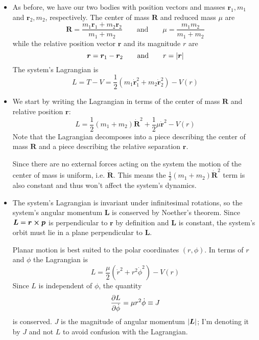 \documentclass[11pt, a4paper]{article}
\newcommand{\eqtext}[1]{\qquad \text{#1} \qquad}
\newcommand{\bdot}[1]{\dot{\bm{#1}}}
\begin{document}
\begin{itemize}
	\item As before, we have our two bodies with position vectors and masses $ \bm{r}_{1}, m_{1} $  and $ \bm{r}_{2}, m_{2}$, respectively. The center of mass $ \bm{R} $ and reduced mass $ \mu $ are
	\begin{equation*}
		 \bm{R} = \frac{m_{1}\bm{r}_{1} + m_{2}\bm{r}_{2}}{m_{1} + m_{2}} \eqtext{and} \mu = \frac{m_{1}m_{2}}{m_{1} + m_{2}}
	\end{equation*}
	while the relative position vector $ \bm{r} $ and its magnitude $ r $ are
	\begin{equation*}
		\bm{r} = \bm{r}_{1} - \bm{r}_{2}  \eqtext{and} r = \abs{\bm{r}}
	\end{equation*}
	The system's Lagrangian is
	\begin{equation*}
		L = T - V = \frac{1}{2}\left(m_{1}\bdot{r}_{1}^{2} + m_{2}\bdot{r}_{2}^{2}\right) - V(r)
	\end{equation*}

	\item We start by writing the Lagrangian in terms of the center of mass $ \bm{R} $ and relative position $ \bm{r} $:
	\begin{equation*}
		L = \frac{1}{2}(m_{1} + m_{2}) \bdot{R}^{2} + \frac{1}{2}\mu \bdot{r}^{2} - V(r)
	\end{equation*}
	Note that the Lagrangian decomposes into a piece describing the center of mass $ \bm{R} $  and a piece describing the relative separation $ \bm{r} $. 
	
	Since there are no external forces acting on the system the motion of the center of mass is uniform, i.e. $ \bdot{R} $. This means the $ \frac{1}{2}(m_{1} + m_{2}) \bdot{R}^{2} $ term is also constant and thus won't affect the system's dynamics. 

	
	\item The system's Lagrangian is invariant under infinitesimal rotations, so the system's angular momentum $ \bm{L} $ is conserved by Noether's theorem. Since $ \bm{L} = \bm{r} \cross \bm{p}  $ is perpendicular to $ \bm{r} $ by definition and $ \bm{L} $ is constant, the system's orbit must lie in a plane perpendicular to $ \bm{L} $. 
	
	Planar motion is best suited to the polar coordinates $ (r, \phi) $. In terms of $ r $ and $ \phi $ the Lagrangian is
	\begin{equation*}
		L = \frac{\mu}{2} \left(\dot{r}^{2} + r^{2} \dot{\phi}^{2}\right) - V(r)
	\end{equation*}
	Since $ L $ is independent of $ \phi $, the quantity 
	\begin{equation*}
		\pdv{L}{\dot{\phi}} = \mu r^{2} \dot{\phi} \equiv J
	\end{equation*}
	is conserved. $ J $ is the magnitude of angular momentum $ \abs{\bm{L}} $; I'm denoting it by $ J $ and not $ L $ to avoid confusion with the Lagrangian.
	

\end{itemize}
\end{document}
